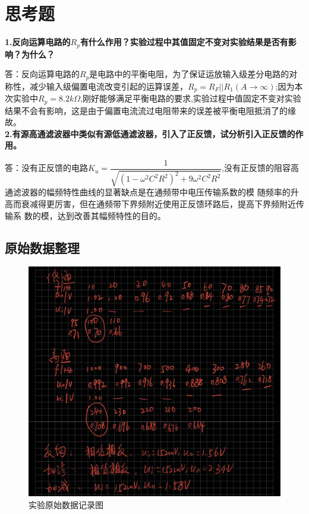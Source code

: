 \documentclass[a4 paper,12pt]{article}
\begin{document}
	\section{思考题}
	\noindent
	\textbf{1.反向运算电路的$R_{p}$有什么作用？实验过程中其值固定不变对实验结果是否有影响？为什么？
}
	\par 答：反向运算电路的$R_{p}$是电路中的平衡电阻，为了保证运放输入级差分电路的对称性，减少输入级偏置电流改变引起的运算误差，$R_{p}=R_{F}||R_{1}(A\rightarrow \infty)$;因为本次实验中$R_{p}=8.2k\Omega$,刚好能够满足平衡电路的要求,实验过程中值固定不变对实验结果不会有影响，这是由于偏置电流流过电阻带来的误差被平衡电阻抵消了的缘故。\\
	\textbf{2.有源高通滤波器中类似有源低通滤波器，引入了正反馈，试分析引入正反馈的作用。
}
	\par 答：没有正反馈的电路$K_{u}=\dfrac{1}{\sqrt{(1-\omega^{2}C^{2}R^{2})^{2}+9\omega^{2}C^{2}R^{2}}}$,没有正反馈的阻容高通滤波器的幅频特性曲线的显著缺点是在通频带中电压传输系数的模
    随频率的升高而衰减得更厉害，但在通频带下界频附近使用正反馈环路后，提高下界频附近传输系
    数的模，达到改善其幅频特性的目的。

	\begin{appendices}
		\section{原始数据整理}
	\begin{figure}[H]
		\centering
		\hspace{2em}\includegraphics[width=.6\linewidth]{pic/1.jpg}
		\caption{\small{实验原始数据记录图}
		}
	\end{figure}
	\end{appendices}
\end{document}
